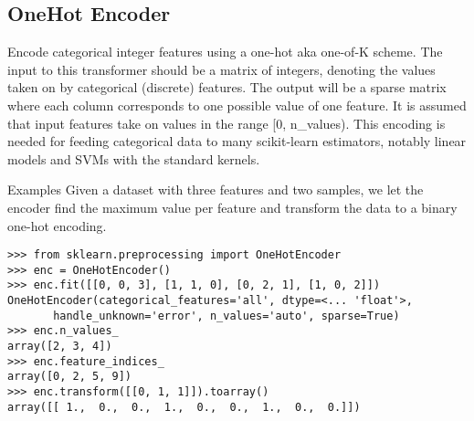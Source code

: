 \subsection{OneHot Encoder}

Encode categorical integer features using a one-hot aka one-of-K scheme.
The input to this transformer should be a matrix of integers, denoting the values taken on by categorical (discrete) features. 
The output will be a sparse matrix where each column corresponds to one possible value of one feature. 
It is assumed that input features take on values in the range [0, n_values).
This encoding is needed for feeding categorical data to many scikit-learn estimators, notably linear models and SVMs with the standard kernels.


Examples
Given a dataset with three features and two samples, we let the encoder find the maximum value per feature and transform the data to a binary one-hot encoding.
\begin{framed}
\begin{verbatim}
>>> from sklearn.preprocessing import OneHotEncoder
>>> enc = OneHotEncoder()
>>> enc.fit([[0, 0, 3], [1, 1, 0], [0, 2, 1], [1, 0, 2]])  
OneHotEncoder(categorical_features='all', dtype=<... 'float'>,
       handle_unknown='error', n_values='auto', sparse=True)
>>> enc.n_values_
array([2, 3, 4])
>>> enc.feature_indices_
array([0, 2, 5, 9])
>>> enc.transform([[0, 1, 1]]).toarray()
array([[ 1.,  0.,  0.,  1.,  0.,  0.,  1.,  0.,  0.]])
\end{verbatim}
\end{framed}
